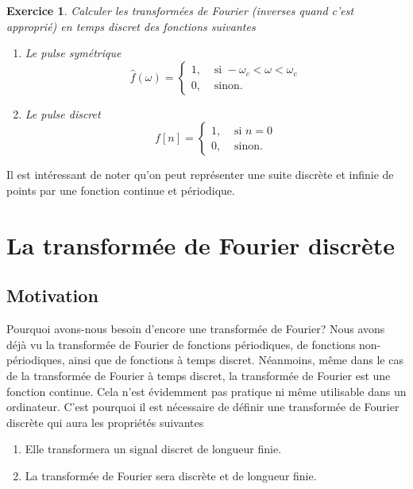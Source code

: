 \documentclass[a4paper,12pt]{book}
\newcommand{\fh}{\hat{f}}
\newtheorem*{exercice}{Exercice}
\begin{document}
 \begin{exercice}
 
 Calculer les transformées de Fourier (inverses quand c'est approprié) 
 en temps discret des fonctions suivantes
 \begin{enumerate}
  \item Le pulse symétrique
  \begin{equation}
   \fh(\omega)=\left\{\begin{array}{ll}
                1,&\mbox{ si }-\omega_c<\omega<\omega_c\\
                0,&\mbox{ sinon.}
               \end{array}\right.
  \end{equation}
  \item Le pulse discret
  \begin{equation}
   f[n]=\left\{\begin{array}{ll}
                1,&\mbox{ si }n=0\\
                0,&\mbox{ sinon.}
               \end{array}\right.
  \end{equation}
 \end{enumerate}

\end{exercice}
Il est intéressant de noter qu'on peut représenter une suite discrète et infinie de points 
par une fonction continue et périodique.


\section{La transformée de Fourier discrète}

\subsection{Motivation}

Pourquoi avons-nous besoin d'encore une transformée de Fourier? Nous avons déjà vu
la transformée de Fourier de fonctions périodiques, de fonctions non-périodiques,
ainsi que de fonctions à temps discret. Néanmoins, même dans le cas de la transformée de Fourier 
à temps discret, la transformée de Fourier est une fonction continue. Cela n'est évidemment 
pas pratique ni même utilisable dans un ordinateur. C'est pourquoi il est nécessaire
de  définir une transformée de Fourier discrète qui aura les propriétés suivantes
\begin{enumerate}
\item Elle transformera un signal discret de longueur finie.
\item La transformée de Fourier sera discrète et de longueur finie.
\end{enumerate}
\end{document}
